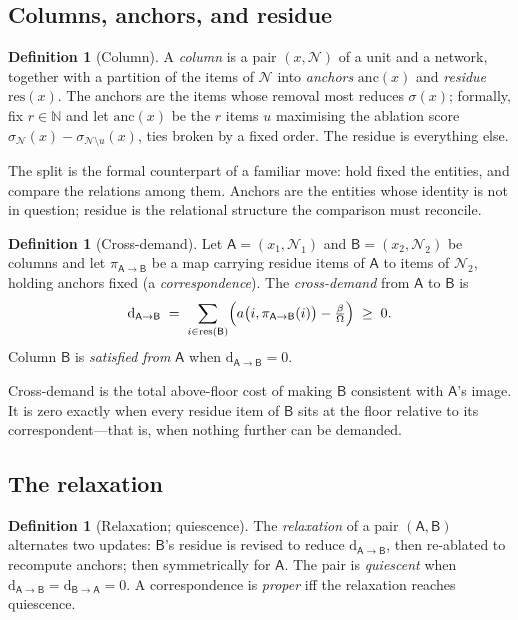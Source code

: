 \documentclass[11pt,twocolumn,a4paper]{article}
\theoremstyle{definition}
\newtheorem{definition}[theorem]{Definition}
\theoremstyle{remark}
\newcommand{\flo}{\beta}
\newcommand{\sep}{\sigma}
\newcommand{\dem}{\mathrm{d}}
\newcommand{\al}{a}
\newcommand{\colA}{\mathsf{A}}
\newcommand{\colB}{\mathsf{B}}
\newcommand{\Nset}{\mathbb{N}}
\newcommand{\anch}{\mathrm{anc}}
\newcommand{\resid}{\mathrm{res}}
\newcommand{\netw}{\mathcal{N}}
\begin{document}
\subsection{Columns, anchors, and residue}

\begin{definition}[Column]
\label{def:column}
A \emph{column} is a pair $(x,\netw)$ of a unit and a network, together
with a partition of the items of $\netw$ into \emph{anchors}
$\anch(x)$ and \emph{residue} $\resid(x)$. The anchors are the items whose
removal most reduces $\sep(x)$; formally, fix $r\in\Nset$ and let
$\anch(x)$ be the $r$ items $u$ maximising the ablation score
$\sep_{\netw}(x)-\sep_{\netw\setminus u}(x)$, ties broken by a fixed
order. The residue is everything else.
\end{definition}

The split is the formal counterpart of a familiar move: hold fixed the
entities, and compare the relations among them. Anchors are the entities
whose identity is not in question; residue is the relational structure the
comparison must reconcile.

\begin{definition}[Cross-demand]
\label{def:demand}
Let $\colA=(x_1,\netw_1)$ and $\colB=(x_2,\netw_2)$ be columns and let
$\pi_{\colA\to\colB}$ be a map carrying residue items of $\colA$ to items
of $\netw_2$, holding anchors fixed (a \emph{correspondence}). The
\emph{cross-demand} from $\colA$ to $\colB$ is
\begin{equation}
  \dem_{\colA\to\colB}
  \;=\;\sum_{i\in\resid(\colB)}
  \Bigl(\al\bigl(i,\pi_{\colA\to\colB}(i)\bigr)-\tfrac{\flo}{\Omega}\Bigr)
  \;\ge\;0 .
  \label{eq:demand}
\end{equation}
Column $\colB$ is \emph{satisfied from} $\colA$ when
$\dem_{\colA\to\colB}=0$.
\end{definition}

Cross-demand is the total above-floor cost of making $\colB$ consistent
with $\colA$'s image. It is zero exactly when every residue item of
$\colB$ sits at the floor relative to its correspondent---that is, when
nothing further can be demanded.

\subsection{The relaxation}

\begin{definition}[Relaxation; quiescence]
\label{def:relax}
The \emph{relaxation} of a pair $(\colA,\colB)$ alternates two updates:
$\colB$'s residue is revised to reduce $\dem_{\colA\to\colB}$, then
re-ablated to recompute anchors; then symmetrically for $\colA$. The pair
is \emph{quiescent} when
$\dem_{\colA\to\colB}=\dem_{\colB\to\colA}=0$. A correspondence is
\emph{proper} iff the relaxation reaches quiescence.
\end{definition}
\end{document}

